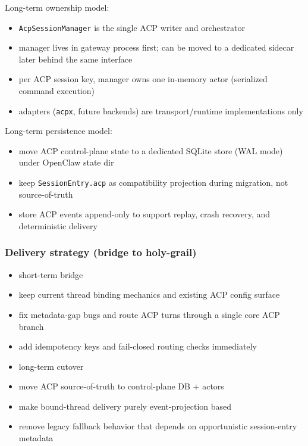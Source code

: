 Long-term ownership model:

\begin{itemize}
  \item \texttt{AcpSessionManager} is the single ACP writer and orchestrator
  \item manager lives in gateway process first; can be moved to a dedicated sidecar later behind the same interface
  \item per ACP session key, manager owns one in-memory actor (serialized command execution)
  \item adapters (\texttt{acpx}, future backends) are transport/runtime implementations only
\end{itemize}


Long-term persistence model:

\begin{itemize}
  \item move ACP control-plane state to a dedicated SQLite store (WAL mode) under OpenClaw state dir
  \item keep \texttt{SessionEntry.acp} as compatibility projection during migration, not source-of-truth
  \item store ACP events append-only to support replay, crash recovery, and deterministic delivery
\end{itemize}


\subsubsection{Delivery strategy (bridge to holy-grail)}


\begin{itemize}
  \item short-term bridge
  \item keep current thread binding mechanics and existing ACP config surface
  \item fix metadata-gap bugs and route ACP turns through a single core ACP branch
  \item add idempotency keys and fail-closed routing checks immediately
  \item long-term cutover
  \item move ACP source-of-truth to control-plane DB + actors
  \item make bound-thread delivery purely event-projection based
  \item remove legacy fallback behavior that depends on opportunistic session-entry metadata
\end{itemize}


